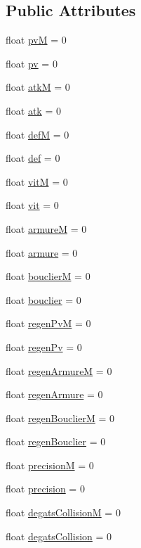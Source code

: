 \subsection*{Public Attributes}
\begin{DoxyCompactItemize}
\item 
float \mbox{\hyperlink{struct_stats_aeab4629ec244a16aa0650f9116cb6617}{pvM}} = 0
\item 
float \mbox{\hyperlink{struct_stats_a2097f1a2792357774e944c923313f509}{pv}} = 0
\item 
float \mbox{\hyperlink{struct_stats_a9bb13fa529483415c37de4dc5d9e9e60}{atkM}} = 0
\item 
float \mbox{\hyperlink{struct_stats_ab39791e705dcf08beea5484c6d961328}{atk}} = 0
\item 
float \mbox{\hyperlink{struct_stats_a61464eedd04a989f5d9d6ffefaf54db8}{defM}} = 0
\item 
float \mbox{\hyperlink{struct_stats_a9044141c4177dc8cc47e48cad7cda949}{def}} = 0
\item 
float \mbox{\hyperlink{struct_stats_af120203659d012f02f8caa0e803a705f}{vitM}} = 0
\item 
float \mbox{\hyperlink{struct_stats_a634d20f3319d16f84d5dd046f4172f41}{vit}} = 0
\item 
float \mbox{\hyperlink{struct_stats_a461c311822f5823e357873e860d5bc7f}{armureM}} = 0
\item 
float \mbox{\hyperlink{struct_stats_afe0c5d28b8ae70881d50a19342e2a0b2}{armure}} = 0
\item 
float \mbox{\hyperlink{struct_stats_a519b38b6c181668a52385b2edb97b66a}{bouclierM}} = 0
\item 
float \mbox{\hyperlink{struct_stats_a77343d5052cc3c6d14a3833b79a59a0f}{bouclier}} = 0
\item 
float \mbox{\hyperlink{struct_stats_af2438df304de00e47c367c8b69b6476d}{regen\+PvM}} = 0
\item 
float \mbox{\hyperlink{struct_stats_a2261f912e1ccf8c6b2057c6fe6cf1852}{regen\+Pv}} = 0
\item 
float \mbox{\hyperlink{struct_stats_a44ee2218d7144cc876b34b40d54875e2}{regen\+ArmureM}} = 0
\item 
float \mbox{\hyperlink{struct_stats_aeedf1d750e5437ad0ff416e6acddd174}{regen\+Armure}} = 0
\item 
float \mbox{\hyperlink{struct_stats_a0faf0e564061394e1f532a194135e55c}{regen\+BouclierM}} = 0
\item 
float \mbox{\hyperlink{struct_stats_a02a13442d1d1c519eecaf854a22090a0}{regen\+Bouclier}} = 0
\item 
float \mbox{\hyperlink{struct_stats_a98960e492558ce2ce16ba26e31546185}{precisionM}} = 0
\item 
float \mbox{\hyperlink{struct_stats_a9bd47ff7ae57b729318962be171f904f}{precision}} = 0
\item 
float \mbox{\hyperlink{struct_stats_a9a8f5be8c1a6d9f981e538934e552f28}{degats\+CollisionM}} = 0
\item 
float \mbox{\hyperlink{struct_stats_af64e3138f60f64a6c578dd4752a94748}{degats\+Collision}} = 0
\end{DoxyCompactItemize}


